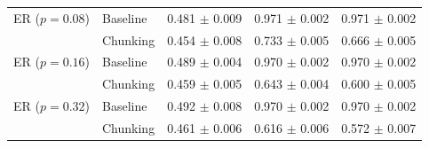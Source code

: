 \begin{table}[t]
\begin{tabular}{@{}l l ccc@{}}
    \midrule
    ER ($p=0.08$) & Baseline & 0.481 $\pm$ 0.009 & 0.971 $\pm$ 0.002 & 0.971 $\pm$ 0.002 \\
     & Chunking & 0.454 $\pm$ 0.008 & 0.733 $\pm$ 0.005 & 0.666 $\pm$ 0.005 \\
    \midrule
    ER ($p=0.16$) & Baseline & 0.489 $\pm$ 0.004 & 0.970 $\pm$ 0.002 & 0.970 $\pm$ 0.002 \\
     & Chunking & 0.459 $\pm$ 0.005 & 0.643 $\pm$ 0.004 & 0.600 $\pm$ 0.005 \\
    \midrule
    ER ($p=0.32$) & Baseline & 0.492 $\pm$ 0.008 & 0.970 $\pm$ 0.002 & 0.970 $\pm$ 0.002 \\
     & Chunking & 0.461 $\pm$ 0.006 & 0.616 $\pm$ 0.006 & 0.572 $\pm$ 0.007 \\
    \bottomrule
  \end{tabular}
\end{table}
